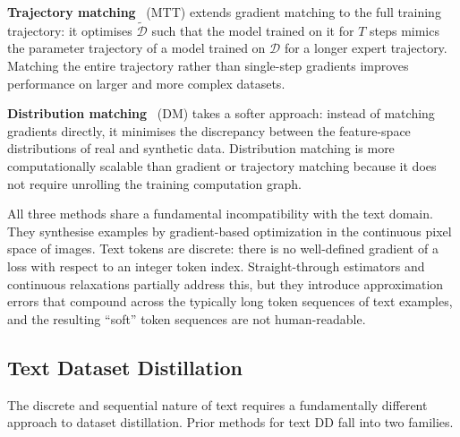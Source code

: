 \begin{foldable}
  \textbf{Trajectory matching}~\cite{cazenavette2022dataset} (MTT) extends gradient matching to the full training trajectory: it optimises $\tilde{\mathcal{D}}$ such that the model trained on it for $T$ steps mimics the parameter trajectory of a model trained on $\mathcal{D}$ for a longer expert trajectory.
  Matching the entire trajectory rather than single-step gradients improves performance on larger and more complex datasets.
\end{foldable}

\begin{foldable}
  \textbf{Distribution matching}~\cite{zhao2023dataset} (DM) takes a softer approach: instead of matching gradients directly, it minimises the discrepancy between the feature-space distributions of real and synthetic data.
  Distribution matching is more computationally scalable than gradient or trajectory matching because it does not require unrolling the training computation graph.
\end{foldable}

\begin{foldable}
  All three methods share a fundamental incompatibility with the text domain.
  They synthesise examples by gradient-based optimization in the continuous pixel space of images.
  Text tokens are discrete: there is no well-defined gradient of a loss with respect to an integer token index.
  Straight-through estimators and continuous relaxations partially address this, but they introduce approximation errors that compound across the typically long token sequences of text examples, and the resulting ``soft'' token sequences are not human-readable.
\end{foldable}

\subsection{Text Dataset Distillation}
\label{sec:26-background-datasetdistillation-text}

\begin{foldable}
  The discrete and sequential nature of text requires a fundamentally different approach to dataset distillation.
  Prior methods for text DD fall into two families.
\end{foldable}

